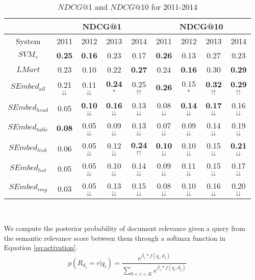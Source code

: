 \begin{table*}
 \caption {$NDCG@$1 and $NDCG@$10 for 2011-2014 }
 \label{table:network_perf} 
 \begin{tabular}{|c||c|c|c|c||c|c|c|c|} \hline
& \multicolumn{4}{|c|}{NDCG@1} &  \multicolumn{4}{|c|}{NDCG@10} \\ \hline
System &  2011 & 2012  & 2013 & 2014 &  2011 & 2012  & 2013 & 2014 \\ \hline
$SVM_r$ & \textbf{0.25} & \textbf{0.16} & 0.23 & 0.17 & \textbf{0.26} & 0.13 & 0.27 & 0.23   \\
$LMart$ & 0.23 & 0.10 & 0.22 & \textbf{0.27} & 0.24 & \textbf{0.16} & 0.30 & \textbf{0.29} \\
$SEmbed_{all}$   & 0.21$^\downdownarrows$ & 0.11$^\downdownarrows$ & \textbf{0.24$^*$}  & 0.25$^\upuparrows$ & \textbf{0.26} & 0.15$^*$ & \textbf{0.32}$^\upuparrows$ & \textbf{0.29}$^\upuparrows$\\ \hline 
$SEmbed_{head}$  & 0.05 & \textbf{0.10}$^\downdownarrows$ & \textbf{0.16}$^\downdownarrows$ & 0.13$^\downdownarrows$ & 0.08$^\downdownarrows$ & \textbf{0.14}$^\downdownarrows$ & \textbf{0.17}$^\downdownarrows$ & 0.16$^\downdownarrows$ \\ 
$SEmbed_{table}$ & \textbf{0.08}& 0.05$^\downdownarrows$& 0.09$^\downdownarrows$ & 0.13$^\downdownarrows$ & 0.07$^\downdownarrows$ & 0.09$^\downdownarrows$ & 0.14$^\downdownarrows$ & 0.19$^\downdownarrows$ \\
$SEmbed_{link}$  & 0.06& 0.05$^\downdownarrows$& 0.12$^\downdownarrows$& \textbf{0.24}$^\upuparrows$ & \textbf{0.10}$^\downdownarrows$ & 0.10$^\downdownarrows$ & 0.15$^\downdownarrows$ & \textbf{0.21}$^\downdownarrows$  \\ 
$SEmbed_{list}$  & 0.05& 0.05$^\downdownarrows$& 0.10$^\downdownarrows$ & 0.14$^\downdownarrows$ & 0.09$^\downdownarrows$ & 0.11$^\downdownarrows$ & 0.15$^\downdownarrows$ & 0.17$^\downdownarrows$\\ 
$SEmbed_{img}$   & 0.03& 0.05$^\downdownarrows$& 0.13$^\downdownarrows$& 0.15$^\downdownarrows$ & 0.08$^\downdownarrows$ & 0.10$^\downdownarrows$ & 0.16$^\downdownarrows$ & 0.20$^\downdownarrows$ \\ \hline
\end{tabular}
\\
 \end{table*}
We compute the posterior probability of document relevance given a query 
from the semantic relevance score between them
through a softmax function in Equation \ref{eq:activation}. 
\begin{equation}
\label{eq:activation}
  p(R_{d_j} = r|q_i) = \frac{e^{\beta_r * f(q_i, d_j)}} {\sum_{0<c<K}e^{\beta_c * f(q_i, d_j)}}
\end{equation}

